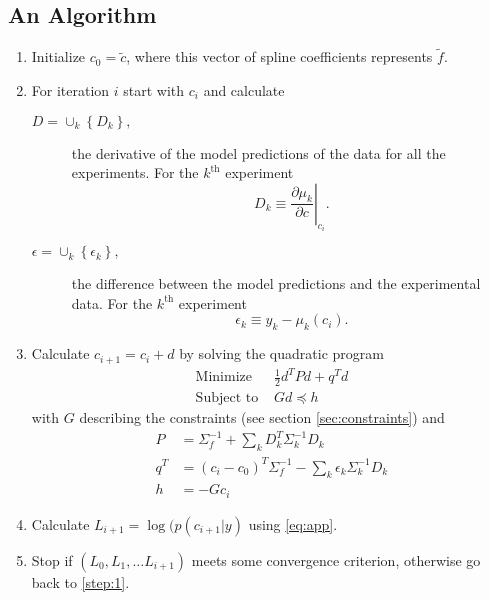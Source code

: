 \documentclass[11pt]{article}
\newcommand{\eos}{f}
\newcommand{\data}{y}
\begin{document}
\subsection{An Algorithm}
\label{sec:algorithm}

\begin{enumerate}
\item \label{step:0} Initialize $c_0 = \tilde c$, where this vector of
  spline coefficients represents $\tilde \eos$.
\item \label{step:1} For iteration $i$ start with $c_i$ and
  calculate
  \begin{description}
  \item[$D=\cup_k \left\{ D_k \right\},$] the derivative of the model
    predictions of the data for all the experiments.  For the
    $k^{\text{th}}$ experiment
    \begin{equation*}
      D_k \equiv \left. \frac{\partial\mu_k}{\partial c}
      \right|_{c_i} .
    \end{equation*}
  \item[$\epsilon=\cup_k \left\{ \epsilon_k \right\},$] the difference
    between the model predictions and the experimental data.  For the
    $k^{\text{th}}$ experiment
    \begin{equation*}
      \epsilon_k \equiv \data_k - \mu_k(c_i) .
    \end{equation*}
  \end{description}
\item \label{step:2} Calculate $c_{i+1} = c_i + d$ by solving
  the quadratic program
\begin{subequations}
  \label{eq:dhat}
  \begin{align}
    \text{Minimize } & \frac{1}{2} d^T P d + q^T d \\
  \label{eq:dhatb}
    \text{Subject to } & Gd \preceq h
  \end{align}
\end{subequations}
with $G$ describing the constraints (see section
\ref{sec:constraints}) and
\begin{subequations}
  \label{eq:opt}
  \begin{align}
    P &= \Sigma_\eos^{-1} + \sum_k D_k^T\Sigma_k^{-1} D_k \\
    q^T &= (c_i - c_0)^T \Sigma_\eos^{-1} - \sum_k \epsilon_k
          \Sigma_k^{-1} D_k \\
    h &= -Gc_i
  \end{align}
\end{subequations}
\item \label{step:3} Calculate $L_{i+1} = \log(p(c_{i+1}|\data)$ using
  \eqref{eq:app}.
\item \label{step:4} Stop if $\left( L_0, L_1, \ldots L_{i+1} \right)$
  meets some convergence criterion, otherwise go back to \ref{step:1}.
\end{enumerate}
\end{document}
